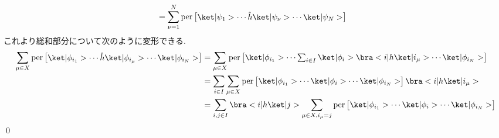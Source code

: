 \documentclass[uplatex,dvipdfmx,a4paper,11pt]{jlreq}
\makeatletter
\DeclareMathOperator{\per}{per}
\numberwithin{equation}{section}
\theoremstyle{definition}
\renewenvironment{proof}[1][\proofname]{\par
  \normalfont
  \topsep6\p@\@plus6\p@ \trivlist
  \item[\hskip\labelsep{\bfseries #1}\@addpunct{\bfseries}]\ignorespaces\quad\par
}{%
  \qed\endtrivlist\@endpefalse
}
\renewcommand\proofname{証明}
\makeatother
\begin{document}
\begin{proof}
\begin{align}
                                                                                         & = \sum_{\nu = 1}^{N}\per\begin{bmatrix}\ket|\psi_1>\cdots\hat{h}\ket|\psi_{\nu}>\cdots\ket|\psi_N>\end{bmatrix}
  \end{align}
  これより総和部分について次のように変形できる.
  \begin{align}
    \sum_{\mu\in X}\per\begin{bmatrix}\ket|\phi_{i_1}>\cdots\hat{h}\ket|\phi_{i_\mu}>\cdots\ket|\phi_{i_N}>\end{bmatrix} & = \sum_{\mu\in X}\per\begin{bmatrix}\ket|\phi_{i_1}>\cdots\sum_{i\in I}\ket|\phi_i>\bra<i|h\ket|i_\mu>\cdots\ket|\phi_{i_N}>\end{bmatrix}          \\
                                                                                                                         & = \sum_{i\in I}\sum_{\mu\in X}\per\begin{bmatrix}\ket|\phi_{i_1}>\cdots\ket|\phi_i>\cdots\ket|\phi_{i_N}>\end{bmatrix}\bra<i|h\ket|i_\mu>          \\
                                                                                                                         & = \sum_{i,j\in I}\bra<i|h\ket|j>\sum_{\mu\in X, i_\mu = j}\per\begin{bmatrix}\ket|\phi_{i_1}>\cdots\ket|\phi_i>\cdots\ket|\phi_{i_N}>\end{bmatrix}
  \end{align}
\end{proof}
\end{document}
